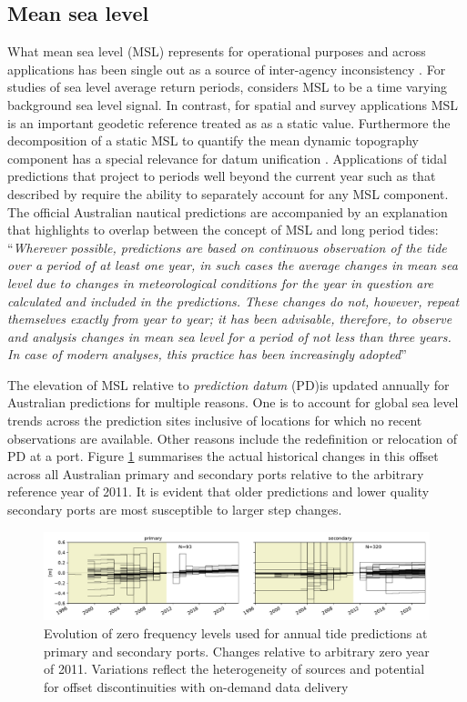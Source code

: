 \subsection{Mean sea level}
\label{Sec:MSL}
What mean sea level (MSL) represents for operational purposes and across applications has been single out as a source of inter-agency inconsistency \citep{MHL2156}.
For studies of sea level average return periods, \citeauthor{Haigh:2013bn} considers MSL to be a time varying background sea level signal.
In contrast, for spatial and survey applications MSL is an important geodetic reference treated as as a static value. Furthermore the decomposition of a static MSL to quantify the mean dynamic topography component has a special relevance for datum unification \citep{Filmer:2018cu}.
Applications of tidal predictions that project to periods well beyond the current year such as that described by \citeauthor{10.1007/s11069-021-04600-4} require the ability to separately account for any MSL component.
The official Australian nautical predictions are accompanied by an explanation that highlights to overlap between the concept of MSL and long period tides:
``\textit{Wherever possible, predictions are based on continuous observation of the tide over a period of at least one year, in such cases the average changes in mean sea level due to changes in meteorological conditions for the year in question are calculated and included in the predictions.  These changes do not, however, repeat themselves exactly from year to year; it has been advisable, therefore, to observe and analysis changes in mean sea level for a period of not less than three years.   In case of modern analyses, this practice has been increasingly adopted}'' \citep{austides}

The elevation of MSL relative to \textit{prediction datum} (PD)is updated annually for Australian predictions for multiple reasons.   One is to account for global sea level trends across the prediction sites inclusive of locations for which no recent observations are available.   Other reasons include the redefinition or relocation of PD at a port.  Figure \ref{fig:z0Evolution} summarises the actual historical 
changes in this offset across all Australian primary and secondary ports relative to the arbitrary reference year of 2011.   It is evident that older predictions and lower quality secondary ports are most susceptible to larger step changes.

\begin{figure}[H]\centering
    \includegraphics[width=\figwidthFull]{figures/plots/Z0_evolution.pdf}
        \caption{Evolution of zero frequency levels used for annual tide predictions at primary and secondary ports. Changes relative to arbitrary zero year of 2011. Variations reflect the heterogeneity of sources and potential for offset discontinuities with on-demand data delivery}
    \label{fig:z0Evolution}
\end{figure}   

